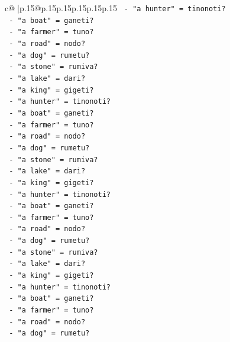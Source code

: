 \documentclass{article}
\begin{document}
{\begin{supertabular}{c@{$\;$}|p{.15\linewidth}@{}p{.15\linewidth}p{.15\linewidth}p{.15\linewidth}p{.15\linewidth}p{.15\linewidth}}
{{{\texttt{                {-} "a hunter" = tinonoti?} \\
\texttt{                {-} "a boat" = ganeti?} \\
\texttt{                {-} "a farmer" = tuno?} \\
\texttt{                {-} "a road" = nodo?} \\
\texttt{                {-} "a dog" = rumetu?} \\
\texttt{                {-} "a stone" = rumiva?} \\
\texttt{                {-} "a lake" = dari?} \\
\texttt{                {-} "a king" = gigeti?} \\
\texttt{                {-} "a hunter" = tinonoti?} \\
\texttt{                {-} "a boat" = ganeti?} \\
\texttt{                {-} "a farmer" = tuno?} \\
\texttt{                {-} "a road" = nodo?} \\
\texttt{                {-} "a dog" = rumetu?} \\
\texttt{                {-} "a stone" = rumiva?} \\
\texttt{                {-} "a lake" = dari?} \\
\texttt{                {-} "a king" = gigeti?} \\
\texttt{                {-} "a hunter" = tinonoti?} \\
\texttt{                {-} "a boat" = ganeti?} \\
\texttt{                {-} "a farmer" = tuno?} \\
\texttt{                {-} "a road" = nodo?} \\
\texttt{                {-} "a dog" = rumetu?} \\
\texttt{                {-} "a stone" = rumiva?} \\
\texttt{                {-} "a lake" = dari?} \\
\texttt{                {-} "a king" = gigeti?} \\
\texttt{                {-} "a hunter" = tinonoti?} \\
\texttt{                {-} "a boat" = ganeti?} \\
\texttt{                {-} "a farmer" = tuno?} \\
\texttt{                {-} "a road" = nodo?} \\
\texttt{                {-} "a dog" = rumetu?} \\
}}}
\end{supertabular}}
\end{document}
